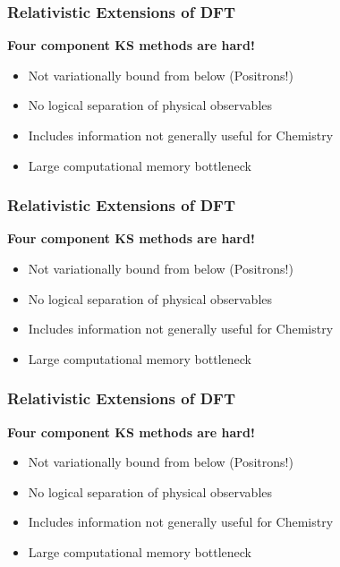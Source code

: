 \documentclass{beamer}
\begin{document}
\begin{frame}
\frametitle{Relativistic Extensions of DFT}

\begin{center} \bf \LARGE Four component KS methods are hard! \end{center}
\begin{itemize}
  \item Not variationally bound from below (Positrons!)
  \item No logical separation of physical observables
  \color{white}
  \item[\color{white}] Includes information not generally useful for Chemistry
  \item[\color{white}] Large computational memory bottleneck
\end{itemize}

\end{frame}

\begin{frame}
\frametitle{Relativistic Extensions of DFT}

\begin{center} \bf \LARGE Four component KS methods are hard! \end{center}
\begin{itemize}
  \item Not variationally bound from below (Positrons!)
  \item No logical separation of physical observables
  \item Includes information not generally useful for Chemistry
  \color{white}
  \item[\color{white}] Large computational memory bottleneck
\end{itemize}

\end{frame}

\begin{frame}
\frametitle{Relativistic Extensions of DFT}

\begin{center} \bf \LARGE Four component KS methods are hard! \end{center}
\begin{itemize}
  \item Not variationally bound from below (Positrons!)
  \item No logical separation of physical observables
  \item Includes information not generally useful for Chemistry
  \item Large computational memory bottleneck
\end{itemize}

\end{frame}
\end{document}
